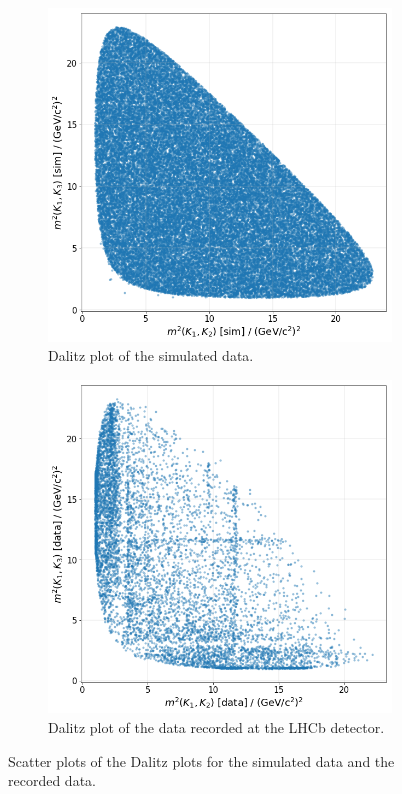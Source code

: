 \begin{figure}
  \centering
  \begin{subfigure}[b]{0.45\textwidth}
      \centering
      \includegraphics[width=\textwidth]{"content/pics/Dalitz_sim.png"}
      \caption{Dalitz plot of the simulated data.}
      \label{fig:dalitz_sim}
  \end{subfigure}
  \hfill
  \begin{subfigure}[b]{0.45\textwidth}
      \centering
      \includegraphics[width=\textwidth]{"content/pics/Dalitz_real.png"}
      \caption{Dalitz plot of the data recorded at the LHCb detector.}
      \label{fig:dalitz_real}
  \end{subfigure}
     \caption{Scatter plots of the Dalitz plots for the simulated data and the recorded data.}
\end{figure}

